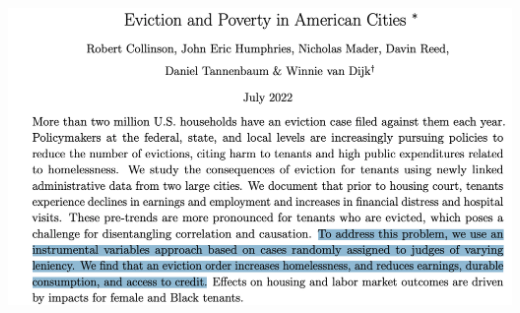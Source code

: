 \documentclass[11pt,english,handout]{beamer}
\begin{document}
\begin{frame}
	\includegraphics[width= 0.9 \linewidth]{eviction}
\end{frame}
\end{document}
